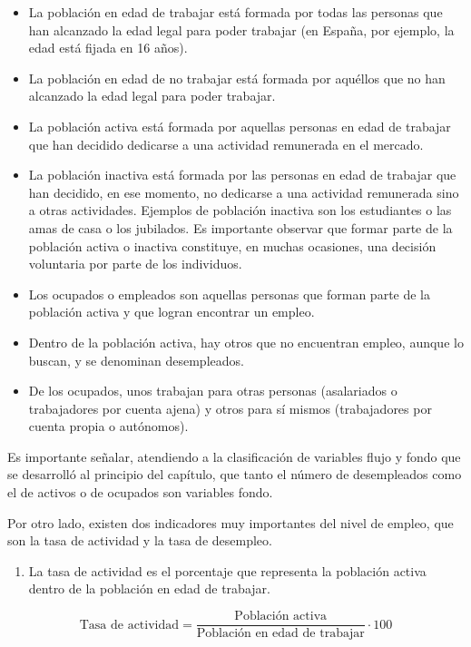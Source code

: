 \documentclass[
]{krantz}
\providecommand{\tightlist}{%
  \setlength{\itemsep}{0pt}\setlength{\parskip}{0pt}}
\begin{document}
\begin{itemize}
\tightlist
\item
  La población en edad de trabajar está formada por todas las personas que han alcanzado la edad legal para poder trabajar (en España, por ejemplo, la edad está fijada en 16 años).
\item
  La población en edad de no trabajar está formada por aquéllos que no han alcanzado la edad legal para poder trabajar.
\item
  La población activa está formada por aquellas personas en edad de trabajar que han decidido dedicarse a una actividad remunerada en el mercado.
\item
  La población inactiva está formada por las personas en edad de trabajar que han decidido, en ese momento, no dedicarse a una actividad remunerada sino a otras actividades. Ejemplos de
  población inactiva son los estudiantes o las amas de casa o los jubilados. Es importante observar que formar parte de la población activa o inactiva constituye, en muchas ocasiones, una decisión voluntaria por parte de los individuos.
\item
  Los ocupados o empleados son aquellas personas que forman parte de la población activa y que logran encontrar un empleo.
\item
  Dentro de la población activa, hay otros que no encuentran empleo, aunque lo buscan, y se denominan desempleados.
\item
  De los ocupados, unos trabajan para otras personas (asalariados o trabajadores por cuenta ajena) y otros para sí mismos (trabajadores por cuenta propia o autónomos).
\end{itemize}

Es importante señalar, atendiendo a la clasificación de variables flujo y fondo que se desarrolló al principio del capítulo, que tanto el número de desempleados como el de activos o de ocupados son variables fondo.

Por otro lado, existen dos indicadores muy importantes del nivel de empleo, que son la tasa de actividad y la tasa de desempleo.

\begin{enumerate}
\def\labelenumi{\alph{enumi})}
\tightlist
\item
  La tasa de actividad es el porcentaje que representa la población activa dentro de la población en edad de trabajar.
\end{enumerate}

\[\mathrm {\text{Tasa de actividad} = \frac{\text{Población activa}}{\text{Población en edad de trabajar}}·100}\]
\end{document}
